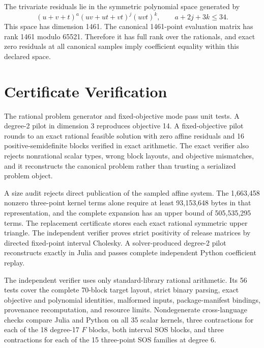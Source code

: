 \documentclass[11pt]{article}
\begin{document}
The trivariate residuals lie in the symmetric polynomial space generated by
\[
  (u+v+t)^a(uv+ut+vt)^j(uvt)^k,
  \qquad a+2j+3k\leq 34.
\]
This space has dimension 1461. The canonical 1461-point evaluation matrix has
rank 1461 modulo 65521. Therefore it has full rank over the rationals, and
exact zero residuals at all canonical samples imply coefficient equality
within this declared space.

\section{Certificate Verification}

The rational problem generator and fixed-objective mode pass unit tests.
A degree-2 pilot in dimension 3 reproduces objective 14. A fixed-objective
pilot rounds to an exact rational feasible solution with zero affine
residuals and 16 positive-semidefinite blocks verified in exact arithmetic.
The exact verifier also rejects nonrational scalar types, wrong block layouts,
and objective mismatches, and it reconstructs the canonical problem rather
than trusting a serialized problem object.

A size audit rejects direct publication of the sampled affine system. The
1,663,458 nonzero three-point kernel terms alone require at least
93,153,648 bytes in that representation, and the complete expansion has an
upper bound of 505,535,295 terms. The replacement certificate stores each
exact rational symmetric upper triangle. The independent verifier proves
strict positivity of release matrices by directed fixed-point interval
Cholesky. A solver-produced degree-2 pilot reconstructs exactly in Julia and
passes complete independent Python coefficient replay.

The independent verifier uses only standard-library rational arithmetic. Its
56 tests cover the complete 70-block target layout, strict binary parsing,
exact objective and polynomial identities, malformed inputs, package-manifest
bindings, provenance recomputation, and resource limits. Nondegenerate
cross-language checks compare
Julia and Python on all 35 scalar kernels, three contractions for each of the
18 degree-17 \(F\) blocks, both interval SOS blocks, and three contractions
for each of the 15 three-point SOS families at degree 6.
\end{document}
